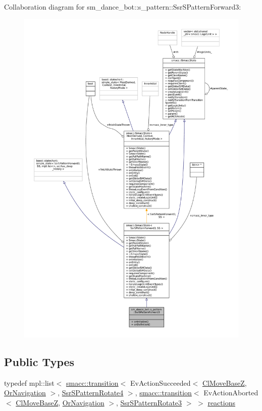 Collaboration diagram for sm\+\_\+dance\+\_\+bot\+:\+:s\+\_\+pattern\+:\+:Ssr\+S\+Pattern\+Forward3\+:
\nopagebreak
\begin{figure}[H]
\begin{center}
\leavevmode
\includegraphics[width=350pt]{structsm__dance__bot_1_1s__pattern_1_1SsrSPatternForward3__coll__graph}
\end{center}
\end{figure}
\subsection*{Public Types}
\begin{DoxyCompactItemize}
\item 
typedef mpl\+::list$<$ \hyperlink{classsmacc_1_1transition}{smacc\+::transition}$<$ Ev\+Action\+Succeeded$<$ \hyperlink{classmove__base__z__client_1_1ClMoveBaseZ}{Cl\+Move\+BaseZ}, \hyperlink{classsm__dance__bot_1_1OrNavigation}{Or\+Navigation} $>$, \hyperlink{structsm__dance__bot_1_1s__pattern_1_1SsrSPatternRotate4}{Ssr\+S\+Pattern\+Rotate4} $>$, \hyperlink{classsmacc_1_1transition}{smacc\+::transition}$<$ Ev\+Action\+Aborted$<$ \hyperlink{classmove__base__z__client_1_1ClMoveBaseZ}{Cl\+Move\+BaseZ}, \hyperlink{classsm__dance__bot_1_1OrNavigation}{Or\+Navigation} $>$, \hyperlink{structsm__dance__bot_1_1s__pattern_1_1SsrSPatternRotate3}{Ssr\+S\+Pattern\+Rotate3} $>$ $>$ \hyperlink{structsm__dance__bot_1_1s__pattern_1_1SsrSPatternForward3_a987f91f910acf4763918bcd6278014e4}{reactions}
\end{DoxyCompactItemize}
